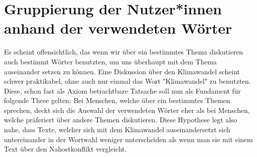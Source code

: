 \chapter{Gruppierung der Nutzer*innen anhand der verwendeten Wörter }
\label{chap:cluster_hashtags}
Es scheint offensichtlich, das wenn wir über ein bestimmtes Thema diskutieren auch bestimmt Wörter benutzten, um uns überhaupt mit dem Thema auseinander setzen zu können. Eine Diskussion über den Klimawandel scheint schwer praktikabel, ohne auch nur einmal das Wort "{}Klimawandel"{} zu benutzten. Diese, schon fast als Axiom betrachtbare Tatsache soll nun als Fundament für folgende These gelten: Bei Menschen, welche über ein bestimmtes Themen sprechen, deckt sich die Auswahl der verwendeten Wörter eher als bei Menschen, welche präferiert über andere Themen diskutieren. Diese Hypothese legt also nahe, dass Texte, welcher sich mit dem Klimawandel auseinandersetzt sich untereinander in der Wortwahl weniger unterscheiden als wenn man sie mit einem Text über den Nahostkonflikt vergleicht.
